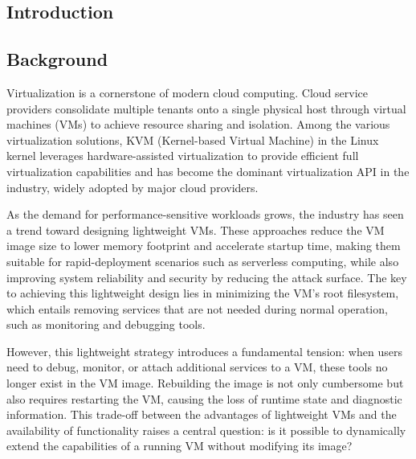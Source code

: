 \begin{ZhChapter}

\chapter{Introduction}
\label{ch:introduction}

\section{Background}
\label{sec:background}

Virtualization is a cornerstone of modern cloud computing. Cloud service providers consolidate multiple tenants onto a single physical host through virtual machines (VMs) to achieve resource sharing and isolation. Among the various virtualization solutions, KVM (Kernel-based Virtual Machine) in the Linux kernel leverages hardware-assisted virtualization to provide efficient full virtualization capabilities and has become the dominant virtualization API in the industry, widely adopted by major cloud providers.

As the demand for performance-sensitive workloads grows, the industry has seen a trend toward designing lightweight VMs. These approaches reduce the VM image size to lower memory footprint and accelerate startup time, making them suitable for rapid-deployment scenarios such as serverless computing, while also improving system reliability and security by reducing the attack surface. The key to achieving this lightweight design lies in minimizing the VM's root filesystem, which entails removing services that are not needed during normal operation, such as monitoring and debugging tools.

However, this lightweight strategy introduces a fundamental tension: when users need to debug, monitor, or attach additional services to a VM, these tools no longer exist in the VM image. Rebuilding the image is not only cumbersome but also requires restarting the VM, causing the loss of runtime state and diagnostic information. This trade-off between the advantages of lightweight VMs and the availability of functionality raises a central question: is it possible to dynamically extend the capabilities of a running VM without modifying its image?


\end{ZhChapter}
